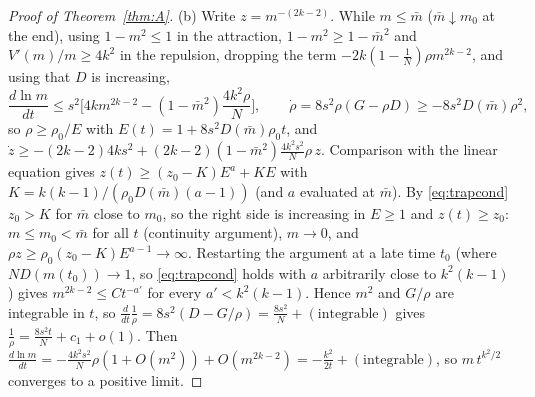 \begin{proof}[Proof of Theorem~\ref{thm:A}]
(b) Write $z=m^{-(2k-2)}$. While $m\le\bar m$ ($\bar m\downarrow m_0$ at the end), using $1-m^2\le1$ in the attraction, $1-m^2\ge1-\bar m^2$ and
$V'(m)/m\ge4k^2$ in the repulsion, dropping the term $-2k(1-\frac1N)\rho m^{2k-2}$, and using that $D$ is increasing,
\[
\frac{d\ln m}{dt}\le s^2\Big[4km^{2k-2}-(1-\bar m^2)\frac{4k^2\rho}{N}\Big],\qquad \dot\rho=8s^2\rho(G-\rho D)\ge-8s^2D(\bar m)\rho^2 ,
\]
so $\rho\ge\rho_0/E$ with $E(t)=1+8s^2D(\bar m)\rho_0t$, and $\dot z\ge-(2k-2)4ks^2+(2k-2)(1-\bar m^2)\frac{4k^2s^2}{N}\rho\,z$. Comparison with the linear
equation gives $z(t)\ge(z_0-K)E^{a}+KE$ with $K=k(k-1)/(\rho_0D(\bar m)(a-1))$ (and $a$ evaluated at $\bar m$). By \eqref{eq:trapcond} $z_0>K$ for $\bar m$
close to $m_0$, so the right side is increasing in $E\ge1$ and $z(t)\ge z_0$: $m\le m_0<\bar m$ for all $t$ (continuity argument), $m\to0$, and
$\rho z\ge\rho_0(z_0-K)E^{a-1}\to\infty$. Restarting the argument at a late time $t_0$ (where $ND(m(t_0))\to1$, so \eqref{eq:trapcond} holds with $a$
arbitrarily close to $k^2(k-1)$) gives $m^{2k-2}\le Ct^{-a'}$ for every $a'<k^2(k-1)$. Hence $m^2$ and $G/\rho$ are integrable in $t$, so
$\frac{d}{dt}\frac1\rho=8s^2(D-G/\rho)=\frac{8s^2}N+(\text{integrable})$ gives $\frac1\rho=\frac{8s^2t}N+c_1+o(1)$. Then
$\frac{d\ln m}{dt}=-\frac{4k^2s^2}N\rho(1+O(m^2))+O(m^{2k-2})=-\frac{k^2}{2t}+(\text{integrable})$, so $m\,t^{k^2/2}$ converges to a positive limit.


\end{proof}
